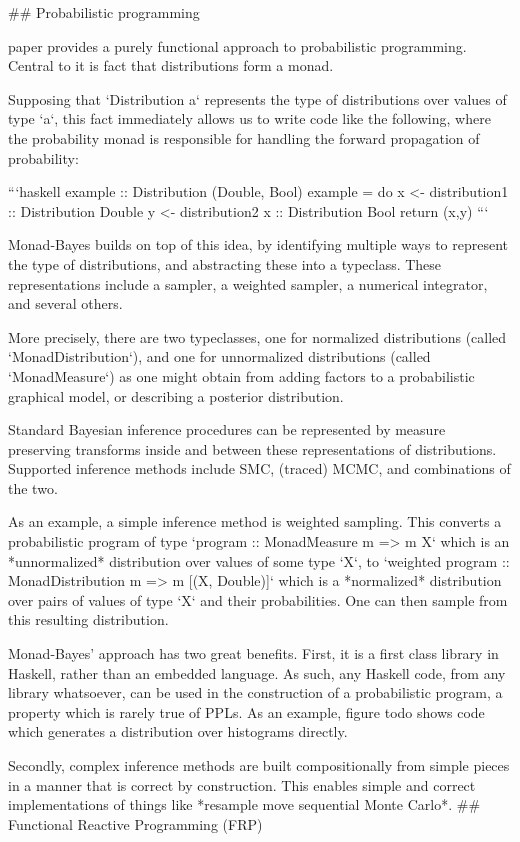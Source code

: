 ## Probabilistic programming

paper
  provides a purely functional approach to probabilistic programming. Central to it is fact that distributions form a monad.

Supposing that `Distribution a` represents the type of distributions over values of type `a`, this fact immediately allows us to write code like the following, where the probability monad is responsible for handling the forward propagation of probability:

```haskell
example :: Distribution (Double, Bool)
example = do
    x <- distribution1 :: Distribution Double
    y <- distribution2 x :: Distribution Bool
    return (x,y)
```

Monad-Bayes builds on top of this idea, by identifying multiple ways to represent the type of distributions, and abstracting these into a typeclass. These representations include a sampler, a weighted sampler, a numerical integrator, and several others.

More precisely, there are two typeclasses, one for normalized distributions (called `MonadDistribution`), and one for unnormalized distributions (called `MonadMeasure`) as one might obtain from adding factors to a probabilistic graphical model, or describing a posterior distribution.

Standard Bayesian inference procedures can be represented by measure preserving transforms inside and between these representations of distributions. Supported inference methods include SMC, (traced) MCMC, and combinations of the two. 

As an example, a simple inference method is weighted sampling. This converts a probabilistic program of type `program :: MonadMeasure m => m X` which is an *unnormalized* distribution over values of some type `X`, to `weighted program :: MonadDistribution m => m [(X, Double)]` which is a *normalized* distribution over pairs of values of type `X` and their probabilities. One can then sample from this resulting distribution. 

Monad-Bayes' approach has two great benefits. First, it is a first class library in Haskell, rather than an embedded language. As such, any Haskell code, from any library whatsoever, can be used in the construction of a probabilistic program, a property which is rarely true of PPLs. As an example, figure todo shows code which generates a distribution over histograms directly.

Secondly, complex inference methods are built compositionally from simple pieces in a manner that is correct by construction. This enables simple and correct implementations of things like *resample move sequential Monte Carlo*.
## Functional Reactive Programming (FRP)

